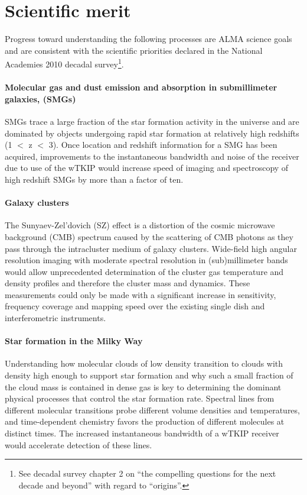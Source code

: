 \section{Scientific merit} %
Progress toward understanding the following processes are  ALMA science goals and are consistent with the scientific priorities declared in the National Academies 2010 decadal survey\footnote{See decadal survey chapter 2 on ``the compelling questions for the next decade and beyond'' with regard to ``origins''.}. 

\paragraph*{Molecular gas and dust emission and absorption in submillimeter galaxies, (SMGs)}
SMGs trace a large fraction of the star formation activity in the universe and are dominated by objects undergoing rapid star formation at relatively high redshifts (1 $<$ z $<$ 3). Once location and redshift information for a SMG has been acquired, improvements to the instantaneous bandwidth and noise of the receiver due to use of the wTKIP would increase speed of imaging and spectroscopy of high redshift SMGs by more than a factor of ten. 



\paragraph*{Galaxy clusters}
The Sunyaev-Zel’dovich (SZ) effect is a distortion of the cosmic microwave background (CMB) spectrum caused by the scattering of CMB photons as they pass through the intracluster medium of  galaxy clusters.  Wide-field high angular resolution imaging with moderate spectral resolution in (sub)millimeter bands would allow unprecedented determination of the cluster gas temperature and density profiles and therefore the cluster mass and dynamics. These measurements could only be made with a significant increase in sensitivity, frequency coverage and mapping speed over the existing single dish and interferometric instruments.

\paragraph*{Star formation in the Milky Way}
Understanding how molecular clouds of low density transition to clouds with density high enough to support star formation and why such a small fraction of the cloud mass is contained in dense gas is key to determining the dominant physical processes that control the star formation rate. Spectral lines from different molecular transitions probe different volume densities and temperatures, and time-dependent chemistry favors the production of different molecules at distinct times. The increased instantaneous bandwidth of a wTKIP receiver would accelerate detection of these lines. 

